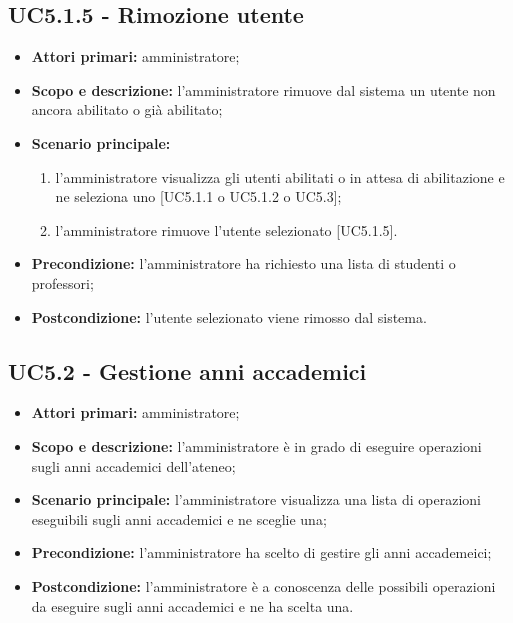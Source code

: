 \documentclass[AnalisiDeiRequisiti.tex]{subfiles}
\begin{document}
\subsection{UC5.1.5 - Rimozione utente}
\begin{itemize}
	\item \textbf{Attori primari:} amministratore;
	\item \textbf{Scopo e descrizione:} l'amministratore rimuove dal sistema un utente non ancora abilitato o già abilitato;
	\item \textbf{Scenario principale:}
	\begin{enumerate}
		\item l'amministratore visualizza gli utenti abilitati o in attesa di abilitazione e ne seleziona uno [UC5.1.1 o UC5.1.2 o UC5.3];
		\item l'amministratore rimuove l'utente selezionato [UC5.1.5].
	\end{enumerate}
	\item \textbf{Precondizione:} l'amministratore ha richiesto una lista di studenti o professori; 
	\item \textbf{Postcondizione:} l'utente selezionato viene rimosso dal sistema.
\end{itemize}
\subsection{UC5.2 - Gestione anni accademici}
\begin{itemize}
	\item \textbf{Attori primari:} amministratore;
	\item \textbf{Scopo e descrizione:} l'amministratore è in grado di eseguire operazioni sugli anni accademici dell'ateneo;
	\item \textbf{Scenario principale:} l'amministratore visualizza una lista di operazioni eseguibili sugli anni accademici e ne sceglie una;
	\item \textbf{Precondizione:} l'amministratore ha scelto di gestire gli anni accademeici; 
	\item \textbf{Postcondizione:} l'amministratore è a conoscenza delle possibili operazioni da eseguire sugli anni accademici e ne ha scelta una.
\end{itemize}
\end{document}
